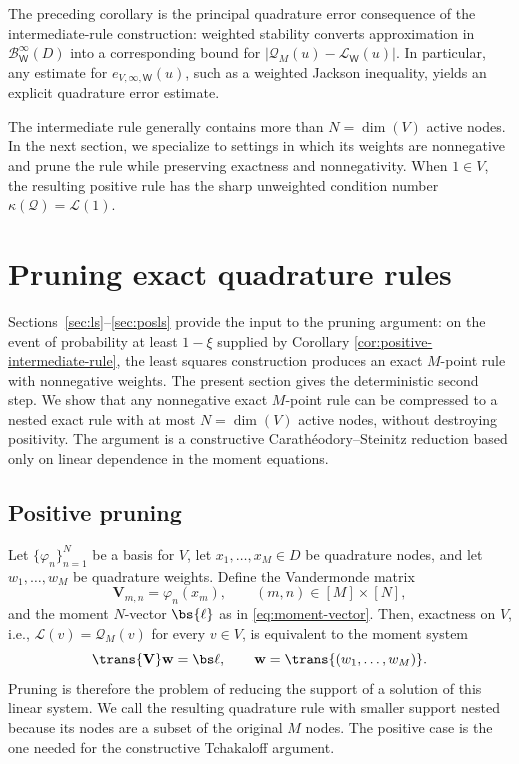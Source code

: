 \documentclass[10pt,dvipsnames]{amsart}
\begin{document}
The preceding corollary is the principal quadrature error consequence of the
intermediate-rule construction: weighted stability converts approximation in
\(\mathcal{B}^\infty_{\mathsf W}(D)\) into a corresponding bound for
\(|\mathcal Q_M(u)-\mathcal L_{\mathsf W}(u)|\). In particular, any estimate for
\(e_{V,\infty,\mathsf W}(u)\), such as a weighted Jackson inequality, yields an
explicit quadrature error estimate.


The intermediate rule generally contains more than \(N=\dim(V)\) active nodes.
In the next section, we specialize to settings in which its weights are nonnegative and prune the rule while preserving exactness and nonnegativity.
When \(1\in V\), the resulting positive rule has the sharp unweighted condition number \( \kappa(\mathcal Q)=\mathcal L(1).\)







\section{Pruning exact quadrature rules}
\label{subsec:reduced}

Sections~\ref{sec:ls}--\ref{sec:posls} provide the input to the
pruning argument: on the event of probability at least \(1-\xi\) supplied by
Corollary \ref{cor:positive-intermediate-rule}, the least squares construction
produces an exact \(M\)-point rule with nonnegative weights. The present
section gives the deterministic second step. We show that any
nonnegative exact \(M\)-point rule can be compressed to a nested exact rule with
at most \(N=\dim(V)\) active nodes, without destroying positivity.  The
argument is a constructive Carath\'eodory--Steinitz reduction based only on
linear dependence in the moment equations.

\subsection{Positive pruning}

Let \(\{\varphi_n\}_{n=1}^N\) be a basis for \(V\), let
\(x_1,\ldots,x_M\in D\) be quadrature nodes, and let \(w_1,\ldots,w_M\) be quadrature weights. Define the Vandermonde matrix
\[
    \mathbf V_{m,n}=\varphi_n(x_m),
    \qquad (m,n)\in [M]\times [N],
\]
and the moment $N$-vector $\bs{\ell}$ as in \eqref{eq:moment-vector}.
Then, exactness on \(V\), i.e., $\mathcal L(v) = \mathcal{Q}_M(v)$ for every $v \in V$,
is equivalent to the moment system
\[
    \trans{\mathbf V}\mathbf w=\bs\ell,
    \qquad
    \mathbf w=\trans{(w_1,\ldots,w_M)}.
\]
Pruning is therefore the problem of reducing the support of a solution of
this linear system.  
We call the resulting quadrature rule with smaller support nested because
its nodes are a subset of the original $M$ nodes.
The positive case is the one needed for the constructive
Tchakaloff argument.
\end{document}
